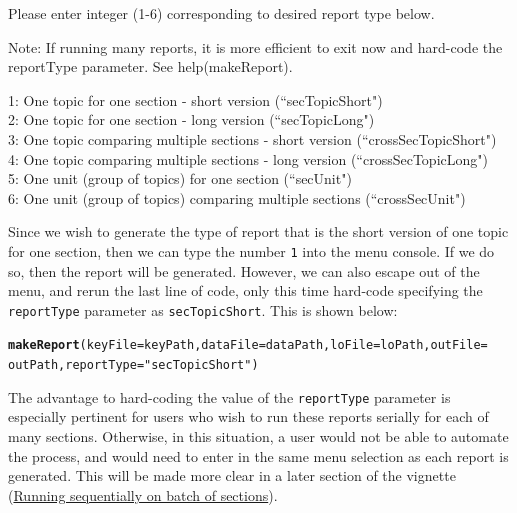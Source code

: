 \documentclass{article}\usepackage[]{graphicx}\usepackage[]{color}
\makeatletter
\newcommand{\hlstr}[1]{\textcolor[rgb]{0.192,0.494,0.8}{#1}}%
\newcommand{\hlstd}[1]{\textcolor[rgb]{0.345,0.345,0.345}{#1}}%
\newcommand{\hlkwc}[1]{\textcolor[rgb]{0.333,0.667,0.333}{#1}}%
\newcommand{\hlkwd}[1]{\textcolor[rgb]{0.737,0.353,0.396}{\textbf{#1}}}%
\newenvironment{kframe}{%
 \def\at@end@of@kframe{}%
 \ifinner\ifhmode%
  \def\at@end@of@kframe{\end{minipage}}%
  \begin{minipage}{\columnwidth}%
 \fi\fi%
 \def\FrameCommand##1{\hskip\@totalleftmargin \hskip-\fboxsep
 \colorbox{shadecolor}{##1}\hskip-\fboxsep
     \hskip-\linewidth \hskip-\@totalleftmargin \hskip\columnwidth}%
 \MakeFramed {\advance\hsize-\width
   \@totalleftmargin\z@ \linewidth\hsize
   \@setminipage}}%
 {\par\unskip\endMakeFramed%
 \at@end@of@kframe}
\newenvironment{knitrout}{}{} %
\numberwithin{equation}{section} %
\makeatother
\begin{document}
\begin{framed}
\vspace{2mm}
Please enter integer (1-6) corresponding to desired report type below.

Note: If running many reports, it is more efficient to exit now and hard-code the reportType parameter. See help(makeReport).

1: One topic for one section - short version (``secTopicShort")\\
2: One topic for one section - long version (``secTopicLong")\\
3: One topic comparing multiple sections - short version (``crossSecTopicShort")\\
4: One topic comparing multiple sections - long version (``crossSecTopicLong")\\
5: One unit (group of topics) for one section (``secUnit")\\
6: One unit (group of topics) comparing multiple sections (``crossSecUnit")
\end{framed}

Since we wish to generate the type of report that is the short version of one topic for one section, then we can type the number \texttt{1} into the menu console. If we do so, then the report will be generated. However, we can also escape out of the menu, and rerun the last line of code, only this time hard-code specifying the \texttt{reportType} parameter as \texttt{secTopicShort}. This is shown below: \\

\begin{knitrout}
\color{fgcolor}\begin{kframe}
\begin{alltt}
\hlkwd{makeReport}\hlstd{(}\hlkwc{keyFile} \hlstd{= keyPath,} \hlkwc{dataFile} \hlstd{= dataPath,} \hlkwc{loFile} \hlstd{= loPath,} \hlkwc{outFile} \hlstd{=}
  \hlstd{outPath,} \hlkwc{reportType} \hlstd{=} \hlstr{"secTopicShort"}\hlstd{)}
\end{alltt}
\end{kframe}
\end{knitrout}

The advantage to hard-coding the value of the \texttt{reportType} parameter is especially pertinent for users who wish to run these reports serially for each of many sections. Otherwise, in this situation, a user would not be able to automate the process, and would need to enter in the same menu selection as each report is generated. This will be made more clear in a later section of the vignette (\hyperref[sec:sequential]{Running sequentially on batch of sections}).
\end{document}
